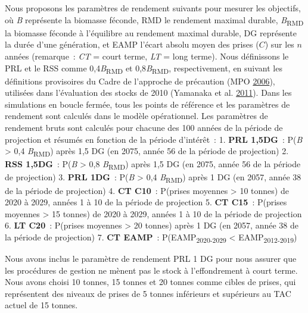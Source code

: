\documentclass[french,11pt]{book}
\begin{document}
Nous proposons les paramètres de rendement suivants pour mesurer les objectifs, où \emph{B} représente la biomasse féconde, RMD le rendement maximal durable, \emph{B}\textsubscript{RMD} la biomasse féconde à l'équilibre au rendement maximal durable, DG représente la durée d'une génération, et EAMP l'écart absolu moyen des prises (\(C\)) sur les \(n\) années (remarque~: \emph{CT} = court terme, \emph{LT} = long terme). Nous définissons le PRL et le RSS comme 0,4\emph{B}\textsubscript{RMD} et 0,8\emph{B}\textsubscript{RMD}, respectivement, en suivant les définitions provisoires du Cadre de l'approche de précaution (MPO \protect\hyperlink{ref-dfo2006}{2006}), utilisées dans l'évaluation des stocks de 2010 (Yamanaka et al. \protect\hyperlink{ref-yamanaka2011}{2011}). Dans les simulations en boucle fermée, tous les points de référence et les paramètres de rendement sont calculés dans le modèle opérationnel. Les paramètres de rendement bruts sont calculés pour chacune des 100 années de la période de projection et résumés en fonction de la période d'intérêt~: 1. \textbf{PRL 1,5DG}~: P(\emph{B} \textgreater{} 0,4 \emph{B}\textsubscript{RMD}) après 1,5 DG (en 2075, année 56 de la période de projection) 2. \textbf{RSS 1,5DG}~: P(\emph{B} \textgreater{} 0,8 \emph{B}\textsubscript{RMD}) après 1,5 DG (en 2075, année 56 de la période de projection) 3. \textbf{PRL 1DG}~: P(\emph{B} \textgreater{} 0,4 \emph{B}\textsubscript{RMD}) après 1 DG (en 2057, année 38 de la période de projection) 4. \textbf{CT C10}~: P(prises moyennes \textgreater{} 10 tonnes) de 2020 à 2029, années 1 à 10 de la période de projection 5. \textbf{CT C15}~: P(prises moyennes \textgreater{} 15 tonnes) de 2020 à 2029, années 1 à 10 de la période de projection 6. \textbf{LT C20}~: P(prises moyennes \textgreater{} 20 tonnes) après 1 DG (en 2057, année 38 de la période de projection) 7. \textbf{CT EAMP}~: P(EAMP\textsubscript{2020-2029} \textless{} EAMP\textsubscript{2012-2019})

Nous avons inclus le paramètre de rendement PRL 1 DG pour nous assurer que les procédures de gestion ne mènent pas le stock à l'effondrement à court terme. Nous avons choisi 10 tonnes, 15 tonnes et 20 tonnes comme cibles de prises, qui représentent des niveaux de prises de 5 tonnes inférieurs et supérieurs au TAC actuel de 15 tonnes.
\end{document}
